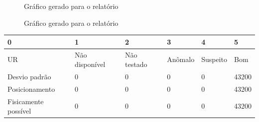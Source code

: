 \documentclass{article}
\begin{document}
\begin{figure}[h!]
\centering
{}
\caption{Gráfico gerado para o relatório}
\end{figure}

\newpage


\begin{figure}[h!]
\centering
{}
\caption{Gráfico gerado para o relatório}
\end{figure}

\newpage

\begin{tabular}{llllll}
\hline
 0                    & 1              & 2           & 3       & 4        & 5     \\
\hline
 UR                   & Não disponível & Não testado & Anômalo & Suspeito & Bom   \\
 Desvio padrão        & 0              & 0           & 0       & 0        & 43200 \\
 Posicionamento       & 0              & 0           & 0       & 0        & 43200 \\
 Fisicamente possível & 0              & 0           & 0       & 0        & 43200 \\
\hline
\end{tabular}
\newpage
\end{document}
